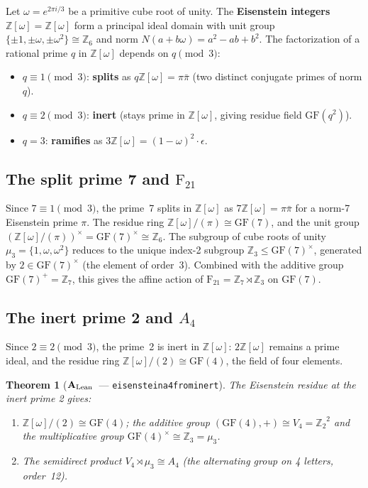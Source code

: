 \documentclass[11pt]{article}
\newtheorem{theorem}{Theorem}[section]
\theoremstyle{remark}
\newcommand{\GF}[1]{\ensuremath{\mathrm{GF}(#1)}}
\newcommand{\lean}[1]{%
  \penalty-100
  \begingroup\def\_{\textunderscore\allowbreak}\texttt{#1}\endgroup}
\newcommand{\FineSeven}{\ensuremath{\mathrm{F}_{21}}}
\newcommand{\Zcyc}[1]{\ensuremath{\mathbb{Z}_{#1}}}
\newcommand{\AltFour}{\ensuremath{A_4}}
\newcommand{\KleinFour}{\ensuremath{V_4}}
\newcommand{\Eisenstein}{\ensuremath{\mathbb{Z}[\omega]}}
\newcommand{\CatAL}{\ensuremath{\textbf{A}_{\rm Lean}}}
\begin{document}
Let $\omega = e^{2\pi i/3}$ be a primitive cube root of unity.
The \textbf{Eisenstein integers} $\Eisenstein = \mathbb{Z}[\omega]$ form a
principal ideal domain with unit group $\{\pm 1, \pm\omega, \pm\omega^2\} \cong
\Zcyc{6}$ and norm $N(a + b\omega) = a^2 - ab + b^2$.
The factorization of a rational prime $q$ in $\Eisenstein$ depends on $q
\pmod{3}$:
\begin{itemize}
  \item $q \equiv 1 \pmod{3}$: \textbf{splits} as $q\Eisenstein = \pi\bar\pi$
    (two distinct conjugate primes of norm $q$).
  \item $q \equiv 2 \pmod{3}$: \textbf{inert} (stays prime in $\Eisenstein$,
    giving residue field $\GF{q^2}$).
  \item $q = 3$: \textbf{ramifies} as $3\Eisenstein = (1-\omega)^2 \cdot \epsilon$.
\end{itemize}

\subsection{The split prime 7 and \texorpdfstring{$\FineSeven$}{F21}}

Since $7 \equiv 1 \pmod{3}$, the prime~7 splits in $\Eisenstein$ as
$7\Eisenstein = \pi\bar\pi$ for a norm-7 Eisenstein prime $\pi$.
The residue ring $\Eisenstein/(\pi) \cong \GF{7}$, and the unit group
$(\Eisenstein/(\pi))^{\times} = \GF{7}^{\times} \cong \Zcyc{6}$.
The subgroup of cube roots of unity $\mu_3 = \{1, \omega, \omega^2\}$
reduces to the unique index-2 subgroup $\Zcyc{3} \leq \GF{7}^{\times}$,
generated by $2 \in \GF{7}^{\times}$ (the element of order~3).
Combined with the additive group $\GF{7}^+ = \Zcyc{7}$, this gives the
affine action of $\FineSeven = \Zcyc{7} \rtimes \Zcyc{3}$ on $\GF{7}$.

\subsection{The inert prime 2 and \texorpdfstring{$\AltFour$}{A4}}

Since $2 \equiv 2 \pmod{3}$, the prime~2 is inert in $\Eisenstein$:
$2\Eisenstein$ remains a prime ideal, and the residue ring
$\Eisenstein/(2) \cong \GF{4}$, the field of four elements.

\begin{theorem}[\CatAL\ --- \lean{eisenstein\_a4\_from\_inert\_2}]
\label{thm:eisenstein_a4}
The Eisenstein residue at the inert prime 2 gives:
\begin{enumerate}[label=(\roman*)]
  \item $\Eisenstein/(2) \cong \GF{4}$; the additive group $(\GF{4},+) \cong
    \KleinFour = \Zcyc{2}^2$ and the multiplicative group $\GF{4}^{\times} \cong
    \Zcyc{3} = \mu_3$.
  \item The semidirect product $\KleinFour \rtimes \mu_3 \cong \AltFour$
    (the alternating group on 4 letters, order~12).
\end{enumerate}
\end{theorem}
\end{document}
